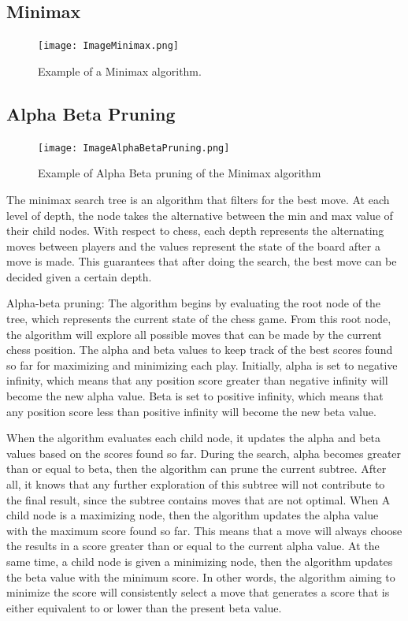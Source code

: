 \documentclass[conference, 11pt]{IEEEtran}
\begin{document}
\subsection{Minimax}

\begin{figure}[htbp]
\centerline{\texttt{[image: ImageMinimax.png]}}
\caption{Example of a Minimax algorithm.}
\label{fig}
\end{figure}

\subsection{Alpha Beta Pruning}

\begin{figure}[htbp]
\centerline{\texttt{[image: ImageAlphaBetaPruning.png]}}
\caption{Example of Alpha Beta pruning of the Minimax algorithm}
\label{fig}
\end{figure}

The minimax search tree is an algorithm that filters for the best move. At each level of depth, the node takes the alternative between the min and max value of their child nodes. With respect to chess, each depth represents the alternating moves between players and the values represent the state of the board after a move is made. This guarantees that after doing the search, the best move can be decided given a certain depth. 

Alpha-beta pruning: The algorithm begins by evaluating the root node of the tree, which represents the current state of the chess game. From this root node, the algorithm will explore all possible moves that can be made by the current chess position. The alpha and beta values to keep track of the best scores found so far for maximizing and minimizing each play. Initially, alpha is set to negative infinity, which means that any position score greater than negative infinity will become the new alpha value. Beta is set to positive infinity, which means that any position score less than positive infinity will become the new beta value.

When the algorithm evaluates each child node, it updates the alpha and beta values based on the scores found so far. During the search, alpha becomes greater than or equal to beta, then the algorithm can prune the current subtree. After all, it knows that any further exploration of this subtree will not contribute to the final result, since the subtree contains moves that are not optimal. When A child node is a maximizing node, then the algorithm updates the alpha value with the maximum score found so far. This means that a move will always choose the results in a score greater than or equal to the current alpha value. At the same time, a child node is given a minimizing node, then the algorithm updates the beta value with the minimum score. In other words, the algorithm aiming to minimize the score will consistently select a move that generates a score that is either equivalent to or lower than the present beta value.
\end{document}
